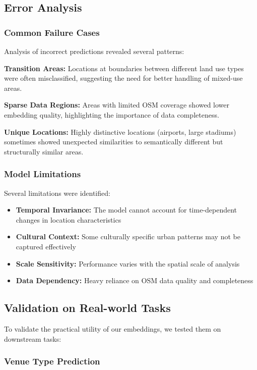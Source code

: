 \subsection{Error Analysis}

\subsubsection{Common Failure Cases}

Analysis of incorrect predictions revealed several patterns:

\textbf{Transition Areas:} Locations at boundaries between different land use types were often misclassified, suggesting the need for better handling of mixed-use areas.

\textbf{Sparse Data Regions:} Areas with limited OSM coverage showed lower embedding quality, highlighting the importance of data completeness.

\textbf{Unique Locations:} Highly distinctive locations (airports, large stadiums) sometimes showed unexpected similarities to semantically different but structurally similar areas.

\subsubsection{Model Limitations}

Several limitations were identified:

\begin{itemize}
    \item \textbf{Temporal Invariance:} The model cannot account for time-dependent changes in location characteristics
    \item \textbf{Cultural Context:} Some culturally specific urban patterns may not be captured effectively
    \item \textbf{Scale Sensitivity:} Performance varies with the spatial scale of analysis
    \item \textbf{Data Dependency:} Heavy reliance on OSM data quality and completeness
\end{itemize}

\subsection{Validation on Real-world Tasks}

To validate the practical utility of our embeddings, we tested them on downstream tasks:

\subsubsection{Venue Type Prediction}

